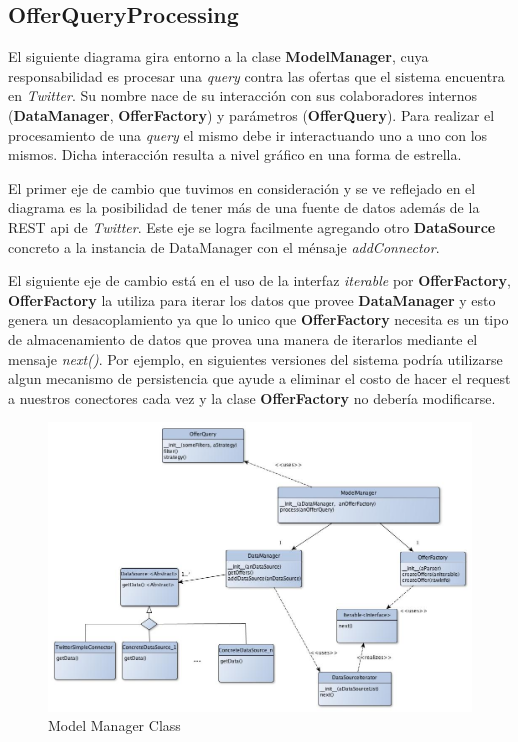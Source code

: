 \documentclass[10pt, a4paper]{article}
\begin{document}
\subsection{OfferQueryProcessing}
El siguiente diagrama gira entorno a la clase \textbf{ModelManager}, cuya responsabilidad es procesar una \emph{query} contra las ofertas que el sistema encuentra en \emph{Twitter}. Su nombre nace de su interacción con sus colaboradores internos (\textbf{DataManager}, \textbf{OfferFactory}) y parámetros (\textbf{OfferQuery}). Para realizar el procesamiento de una \emph{query} el mismo debe ir interactuando uno a uno con los mismos. Dicha interacción resulta a nivel gr\'afico en una forma de estrella.

El primer eje de cambio que tuvimos en consideración y se ve reflejado en el diagrama es la posibilidad de tener más de una fuente de datos adem\'as de la REST api de \emph{Twitter}. Este eje se logra facilmente agregando otro \textbf{DataSource} concreto a la instancia de  DataManager con el m\'ensaje \emph{addConnector}.

El siguiente eje de cambio est\'a en el uso de la interfaz \emph{iterable} por \textbf{OfferFactory}, \textbf{OfferFactory} la utiliza para iterar los datos que provee \textbf{DataManager} y esto genera un desacoplamiento ya que lo unico que \textbf{OfferFactory} necesita es un tipo de almacenamiento de datos que provea una manera de iterarlos mediante el mensaje \emph{next()}. Por ejemplo, en siguientes versiones del sistema podría utilizarse algun mecanismo de persistencia que ayude a eliminar el costo de hacer el request a nuestros conectores cada vez y la clase \textbf{OfferFactory} no deber\'ia modificarse. 

\begin{figure}[H]
\centering
\includegraphics[scale=0.50]{graphics/model_manager_iterable_class.jpg}
\caption{Model Manager Class}
\end{figure}
\end{document}
